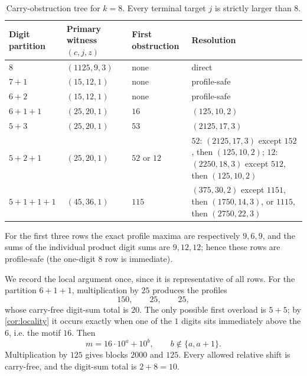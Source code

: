\documentclass[11pt]{article}
\begin{document}
\begin{table}[ht]
\centering
\small
\begin{tabular}{@{}P{2.4cm}P{2.6cm}P{3.0cm}P{5.2cm}@{}}
\toprule
Digit partition & Primary witness $(c,j,z)$ & First obstruction & Resolution \\
\midrule
$8$ & $(1125,9,3)$ & none & direct \\
$7+1$ & $(15,12,1)$ & none & profile-safe \\
$6+2$ & $(15,12,1)$ & none & profile-safe \\
$6+1+1$ & $(25,20,1)$ & $16$ & $(125,10,2)$ \\
$5+3$ & $(25,20,1)$ & $53$ & $(2125,17,3)$ \\
$5+2+1$ & $(25,20,1)$ & $52$ or $12$ & $52$: $(2125,17,3)$ except $152$, then $(125,10,2)$; $12$: $(2250,18,3)$ except $512$, then $(125,10,2)$ \\
$5+1+1+1$ & $(45,36,1)$ & $115$ & $(375,30,2)$ except $1151$, then $(1750,14,3)$, or $1115$, then $(2750,22,3)$ \\
\bottomrule
\end{tabular}
\caption{Carry-obstruction tree for $k=8$.  Every terminal target $j$ is strictly larger than 8.}
\label{tab:k8}
\end{table}

For the first three rows the exact profile maxima are respectively $9,6,9$, and the sums of the individual product digit sums are $9,12,12$; hence these rows are profile-safe (the one-digit $8$ row is immediate).

We record the local argument once, since it is representative of all rows.  For the partition $6+1+1$, multiplication by $25$ produces the profiles
\[
 150,\qquad25,\qquad25,
\]
whose carry-free digit-sum total is $20$.  The only possible first overload is $5+5$; by \cref{cor:locality} it occurs exactly when one of the $1$ digits sits immediately above the $6$, i.e. the motif $16$.  Then
\[
 m=16\cdot10^a+10^b,
 \qquad b\notin\{a,a+1\}.
\]
Multiplication by $125$ gives blocks $2000$ and $125$.  Every allowed relative shift is carry-free, and the digit-sum total is $2+8=10$.
\end{document}
